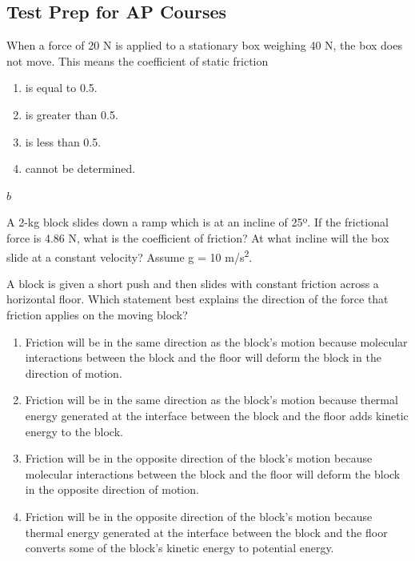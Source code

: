 \documentclass[
]{book}
\providecommand{\tightlist}{%
  \setlength{\itemsep}{0pt}\setlength{\parskip}{0pt}}
\newenvironment{ap-test-prep}{}{}
\begin{document}
\hypertarget{import-auto-id0000006}{}
\begin{ap-test-prep}

\hypertarget{test-prep-for-ap-courses-15}{%
\subsection{Test Prep for AP Courses}\label{test-prep-for-ap-courses-15}}

\hypertarget{import-auto-id0000007}{}
\leavevmode\hypertarget{import-auto-id0000008}{}%
When a force of 20 N is applied to a stationary box weighing 40 N, the
box does not move. This means the coefficient of static friction

\begin{enumerate}
\def\labelenumi{\alph{enumi}.}
\tightlist
\item
  is equal to 0.5.
\item
  is greater than 0.5.
\item
  is less than 0.5.
\item
  cannot be determined.
\end{enumerate}

\leavevmode\hypertarget{import-auto-id0000011}{}%
\(b\)

\hypertarget{import-auto-id0000013}{}
\leavevmode\hypertarget{import-auto-id0000014}{}%
A 2-kg block slides down a ramp which is at an incline of 25º. If the
frictional force is 4.86 N, what is the coefficient of friction? At what
incline will the box slide at a constant velocity? Assume g = 10 m/s\textsuperscript{2}.

\hypertarget{import-auto-id0000018}{}
\leavevmode\hypertarget{import-auto-id0000019}{}%
A block is given a short push and then slides with constant friction
across a horizontal floor. Which statement best explains the direction
of the force that friction applies on the moving block?

\begin{enumerate}
\def\labelenumi{\alph{enumi}.}
\tightlist
\item
  Friction will be in the same direction as the block's motion
  because molecular interactions between the block and the floor will
  deform the block in the direction of motion.
\item
  Friction will be in the same direction as the block's motion
  because thermal energy generated at the interface between the block
  and the floor adds kinetic energy to the block.
\item
  Friction will be in the opposite direction of the block's motion
  because molecular interactions between the block and the floor will
  deform the block in the opposite direction of motion.
\item
  Friction will be in the opposite direction of the block's motion
  because thermal energy generated at the interface between the block
  and the floor converts some of the block's kinetic energy to
  potential energy.
\end{enumerate}


\end{ap-test-prep}
\end{document}
